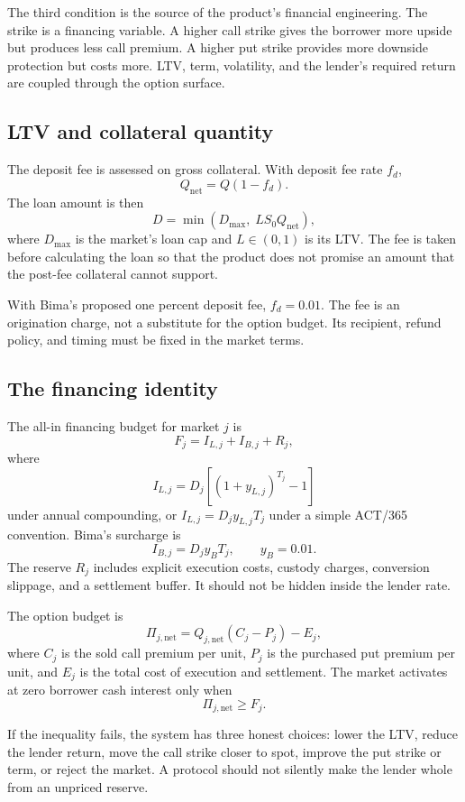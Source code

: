 \documentclass[11pt,oneside]{article}
\begin{document}
The third condition is the source of the product's financial engineering. The strike is a financing variable. A higher call strike gives the borrower more upside but produces less call premium. A higher put strike provides more downside protection but costs more. LTV, term, volatility, and the lender's required return are coupled through the option surface.

\subsection{LTV and collateral quantity}

The deposit fee is assessed on gross collateral. With deposit fee rate $f_d$,
\[
Q_{\mathrm{net}}=Q(1-f_d).
\]
The loan amount is then
\[
D=\min\left(D_{\max},\;L S_0 Q_{\mathrm{net}}\right),
\]
where $D_{\max}$ is the market's loan cap and $L\in(0,1)$ is its LTV. The fee is taken before calculating the loan so that the product does not promise an amount that the post-fee collateral cannot support.

With Bima's proposed one percent deposit fee, $f_d=0.01$. The fee is an origination charge, not a substitute for the option budget. Its recipient, refund policy, and timing must be fixed in the market terms.

\subsection{The financing identity}

The all-in financing budget for market $j$ is
\[
F_j=I_{L,j}+I_{B,j}+R_j,
\]
where
\[
I_{L,j}=D_j\left[(1+y_{L,j})^{T_j}-1\right]
\]
under annual compounding, or $I_{L,j}=D_j y_{L,j}T_j$ under a simple ACT/365 convention. Bima's surcharge is
\[
I_{B,j}=D_j y_B T_j,
\qquad y_B=0.01.
\]
The reserve $R_j$ includes explicit execution costs, custody charges, conversion slippage, and a settlement buffer. It should not be hidden inside the lender rate.

The option budget is
\[
\Pi_{j,\mathrm{net}}=Q_{j,\mathrm{net}}\left(C_j-P_j\right)-E_j,
\]
where $C_j$ is the sold call premium per unit, $P_j$ is the purchased put premium per unit, and $E_j$ is the total cost of execution and settlement. The market activates at zero borrower cash interest only when
\[
\Pi_{j,\mathrm{net}}\geq F_j.
\]

If the inequality fails, the system has three honest choices: lower the LTV, reduce the lender return, move the call strike closer to spot, improve the put strike or term, or reject the market. A protocol should not silently make the lender whole from an unpriced reserve.
\end{document}
